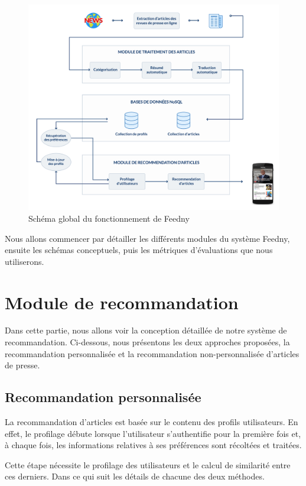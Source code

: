 \begin{figure}[H]
    \centering
    \includegraphics[width=450pt]{img/chapter3/global.png}
    \caption{Schéma global du fonctionnement de \textquotedbl Feedny\textquotedbl }
    \label{shemaglobal}
\end{figure}

Nous allons commencer par détailler les différents modules du système \textquotedbl Feedny\textquotedbl, ensuite les schémas conceptuels, puis les métriques d'évaluations que nous utiliserons. \\
\section{Module de recommandation}
Dans cette partie, nous allons voir la conception détaillée de notre système de recommandation. Ci-dessous, nous présentons les deux approches proposées, la recommandation personnalisée et la recommandation non-personnalisée d'articles de presse.
    \subsection{Recommandation personnalisée\label{personal}}
    La recommandation d'articles est basée sur le contenu des profils utilisateurs. En effet, le profilage débute lorsque l'utilisateur s'authentifie pour la première fois et, à chaque fois, les informations relatives à ses préférences sont récoltées et traitées.

    Cette étape nécessite le profilage des utilisateurs et le calcul de similarité entre ces derniers. Dans ce qui suit les détails de chacune des deux méthodes.

